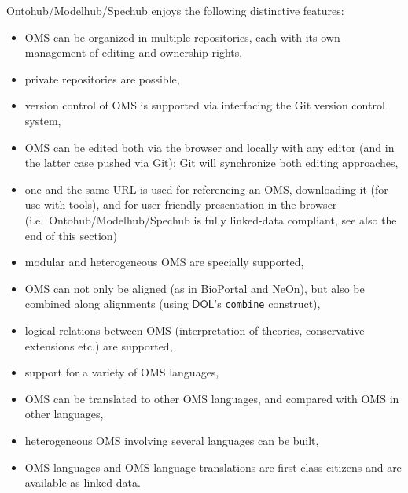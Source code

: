 \documentclass[10pt,fleqn,final]{scrreprt}
\newcommand*{\syntax}[1]{\texttt{#1}}
\newcommand*{\DOL}{\ensuremath{\mathsf{DOL}}\xspace}
\begin{document}
Ontohub/Modelhub/Spechub enjoys the following distinctive features:
\begin{itemize}
  \item OMS can be organized in multiple repositories, each
     with its own management of editing and ownership rights,
  \item private repositories are possible,
  \item version control of OMS is supported via interfacing
   the Git version control system,
  \item OMS can be edited both via the browser and locally with any
  editor (and in the latter case pushed via Git); Git will synchronize both editing approaches,
  \item one and the same URL is used for referencing an OMS, downloading
     it (for use with tools), and for user-friendly presentation in
     the browser (i.e.\ Ontohub/Modelhub/Spechub is fully linked-data compliant,  see also the end of this section)
  \item modular and heterogeneous OMS are specially supported,
  \item OMS can not only be aligned (as in BioPortal and NeOn), but also be combined along alignments (using \DOL's \syntax{combine} construct),
  \item logical relations between OMS (interpretation of theories, conservative
  extensions etc.) are supported,
  \item support for a variety of OMS languages, 
  \item OMS can be translated to other OMS languages, and compared with
   OMS in other languages,
  \item heterogeneous OMS involving several languages can be built,
  \item OMS languages and OMS language translations are first-class
   citizens and are available as linked data.
\end{itemize}
\end{document}
